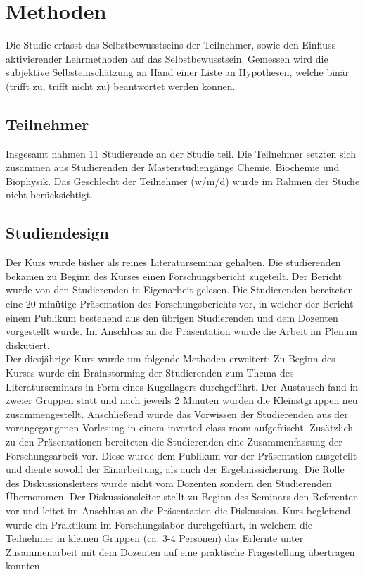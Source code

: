 \section{Methoden}
Die Studie erfasst das Selbstbewusstseins der Teilnehmer, sowie den Einfluss aktivierender Lehrmethoden auf das Selbstbewusstsein. Gemessen wird die subjektive Selbsteinschätzung an Hand einer Liste an Hypothesen, welche binär (trifft zu, trifft nicht zu) beantwortet werden können.

\subsection{Teilnehmer}
Insgesamt nahmen 11 Studierende an der Studie teil. Die Teilnehmer setzten sich zusammen aus Studierenden der Masterstudiengänge Chemie, Biochemie und Biophysik. Das Geschlecht der Teilnehmer (w/m/d) wurde im Rahmen der Studie nicht berücksichtigt.

\subsection{Studiendesign}
Der Kurs wurde bisher als reines Literaturseminar gehalten. Die studierenden bekamen zu Beginn des Kurses einen Forschungsbericht zugeteilt. Der Bericht wurde von den Studierenden in Eigenarbeit gelesen. Die Studierenden bereiteten eine 20 minütige Präsentation des Forschungsberichts vor, in welcher der Bericht einem Publikum bestehend aus den übrigen Studierenden und dem Dozenten vorgestellt wurde. Im Anschluss an die Präsentation wurde die Arbeit im Plenum diskutiert.\\
\noindent
Der diesjährige Kurs wurde um folgende Methoden erweitert: Zu Beginn des Kurses wurde ein Brainstorming der Studierenden zum Thema des Literaturseminars in Form eines Kugellagers durchgeführt. Der Austausch fand in zweier Gruppen statt und nach jeweils 2 Minuten wurden die Kleinstgruppen neu zusammengestellt. Anschließend wurde das Vorwissen der Studierenden aus der vorangegangenen Vorlesung in einem inverted class room aufgefrischt. Zusätzlich zu den Präsentationen bereiteten die Studierenden eine Zusammenfassung der Forschungsarbeit vor. Diese wurde dem Publikum vor der Präsentation ausgeteilt und diente sowohl der Einarbeitung, als auch der Ergebnissicherung. Die Rolle des Diskussionsleiters wurde nicht vom Dozenten sondern den Studierenden Übernommen. Der Diskussionsleiter stellt zu Beginn des Seminars den Referenten vor und leitet im Anschluss an die Präsentation die Diskussion. Kurs begleitend wurde ein Praktikum im Forschungslabor durchgeführt, in welchem die Teilnehmer in kleinen Gruppen (ca. 3-4 Personen) das Erlernte unter Zusammenarbeit mit dem Dozenten auf eine praktische Fragestellung übertragen konnten.

